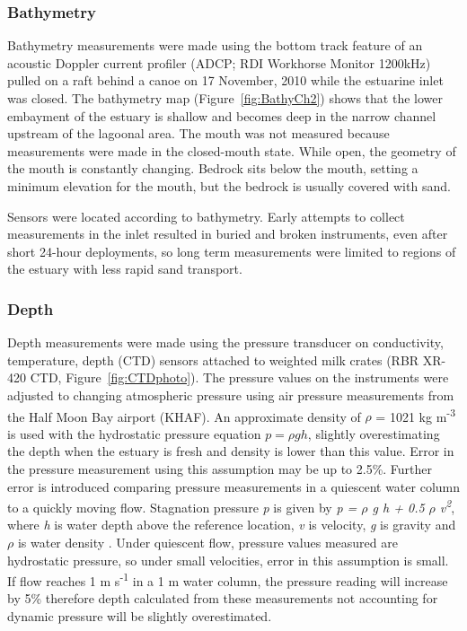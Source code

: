 \subsubsection{Bathymetry} \label{sssec:bathymetry}
Bathymetry measurements were made using the bottom track feature of an acoustic Doppler current profiler (ADCP; RDI Workhorse Monitor 1200kHz) pulled on a raft behind a canoe on 17 November, 2010 while the estuarine inlet was closed. The bathymetry map (Figure~\ref{fig:BathyCh2}) shows that the lower embayment of the estuary is shallow and becomes deep in the narrow channel upstream of the lagoonal area. The mouth was not measured because measurements were made in the closed-mouth state. While open, the geometry of the mouth is constantly changing. Bedrock sits below the mouth, setting a minimum elevation for the mouth, but the bedrock is usually covered with sand. 

Sensors were located according to bathymetry. Early attempts to collect measurements in the inlet resulted in buried and broken instruments, even after short 24-hour deployments, so long term measurements were limited to regions of the estuary with less rapid sand transport. 

\subsubsection{Depth} \label{sssec:depth}
Depth measurements were made using the pressure transducer on conductivity, temperature, depth (CTD) sensors attached to weighted milk crates (RBR XR-420 CTD, Figure~\ref{fig:CTDphoto}). The pressure values on the instruments were adjusted to changing atmospheric pressure using air pressure measurements from the Half Moon Bay airport (KHAF). An approximate density of $\rho$ = 1021 kg m\textsuperscript{-3} is used with the hydrostatic pressure equation ${p = \rho g h}$, slightly overestimating the depth when the estuary is fresh and density is lower than this value. Error in the pressure measurement using this assumption may be up to 2.5\%. Further error is introduced comparing pressure measurements in a quiescent water column to a quickly moving flow. Stagnation pressure \emph{p} is given by \emph{p = $\rho$ g h +  0.5 $\rho$ v\textsuperscript{2}}, where \emph{h} is water depth above the reference location, \emph{v} is velocity, \emph{g} is gravity and \emph{$\rho$} is water density \parencite{young_brief_2004}. Under quiescent flow, pressure values measured are hydrostatic pressure, so under small velocities, error in this assumption is small. If flow reaches 1 m s\textsuperscript{-1} in a 1 m water column, the pressure reading will increase by 5\% therefore depth calculated from these measurements not accounting for dynamic pressure will be slightly overestimated.

